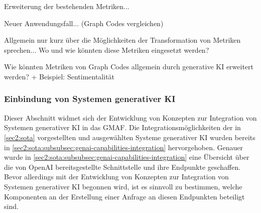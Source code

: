 Erweiterung der bestehenden Metriken...

Neuer Anwendungsfall... (Graph Codes vergleichen)

Allgemein nur kurz über die Möglichkeiten der Transformation von Metriken sprechen...
Wo und wie könnten diese Metriken eingesetzt werden?

Wie könnten Metriken von Graph Codes allgemein durch generative KI erweitert werden? + Beispiel: Sentimentalität





%
%
%
%
%

\subsubsection{Einbindung von Systemen generativer KI}
\label{sec3:model:subsubsec:genai-integration}
Dieser Abschnitt widmet sich der Entwicklung von Konzepten zur Integration von Systemen generativer KI in das GMAF.
Die Integrationsmöglichkeiten der in \cref{sec2:sota} vorgestellten und ausgewählten Systeme generativer KI wurden bereits in \cref{sec2:sota:subsubsec:genai-capabilities-integration} hervorgehoben.
Genauer wurde in \cref{sec2:sota:subsubsec:genai-capabilities-integration} eine Übersicht über die von OpenAI bereitsgestellte Schnittstelle und ihre Endpunkte geschaffen.
Bevor allerdings mit der Entwicklung von Konzepten zur Integration von Systemen generativer KI begonnen wird, ist es sinnvoll zu bestimmen, welche Komponenten an der Erstellung einer Anfrage an diesen Endpunkten beteiligt sind.

